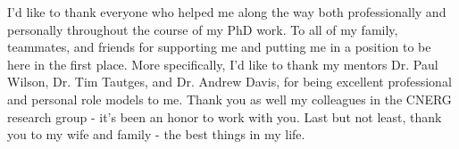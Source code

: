 



I'd like to thank everyone who helped me along the way both professionally and
personally throughout the course of my PhD work. To all of my family, teammates,
and friends for supporting me and putting me in a position to be here in the
first place. More specifically, I'd like to thank my mentors Dr. Paul Wilson, Dr.
Tim Tautges, and Dr. Andrew Davis, for being excellent professional and personal role models
to me. Thank you as well my colleagues in the CNERG research group - it's been
an honor to work with you. Last but not least, thank you to my wife and family -
the best things in my life.
